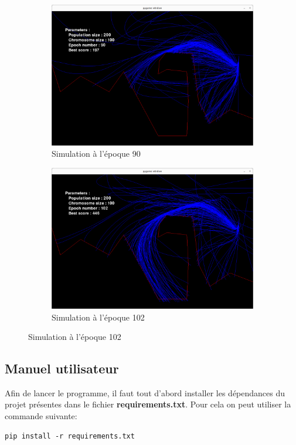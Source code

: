 \documentclass[french,a4paper,10pt,twocolumn]{article}
\begin{document}
\begin{figure}[H]
\begin{subfigure}[b]{0.45\textwidth}
        \includegraphics[width=\textwidth]{images/90_epoch_rc_ga.png}
        \caption{Simulation à l'époque 90}
    \end{subfigure}
    \hfill
    \begin{subfigure}[b]{0.45\textwidth}
        \centering
        \includegraphics[width=\textwidth]{images/102_epoch_rc_ga.png}
        \caption{Simulation à l'époque 102}
    \end{subfigure}

\end{figure}

\subsection{Manuel utilisateur}

Afin de lancer le programme, il faut tout d'abord installer les dépendances du projet présentes dans le fichier \textbf{requirements.txt}.
Pour cela on peut utiliser la commande suivante:
\begin{lstlisting}[style=bash]
    pip install -r requirements.txt
\end{lstlisting}
\end{document}
